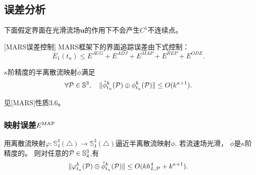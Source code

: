 \subsection{误差分析}
\begin{rem}
  下面假定界面在光滑流场$\mathbf{u}$的作用下不会产生$C^1$不连续点。
\end{rem}

\begin{thm}\cite{zhang2016mars}[MARS误差控制]
  MARS框架下的界面追踪误差由下式控制：
   \begin{equation}
    E_1(t_n)\leq E^{AUG}+E^{ADJ}+E^{MAP}+E^{REP}+E^{ODE}.
  \end{equation}
\end{thm}

\begin{prop}
  $\kappa$阶精度的半离散流映射$\mathring{\phi}$满足
  \begin{equation}
    \label{eq:1}
    \forall {\cal P} \in \mathbb{S}^3,\quad
    \lVert \mathring{\phi}^k_{t_n}({\cal P})\oplus
    \phi^k_{t_n}({\cal P})\rVert \leq O(k^{\kappa +1}).
  \end{equation}
\end{prop}
\begin{pro}
  见[MARS]\cite{zhang2016mars}性质3.6。
\end{pro}

\subsubsection{映射误差$E^{\textmd{MAP}}$}
\label{sec:拟合误差}



\begin{lem}\label{lem:maperror}
  用离散流映射$\varphi:\mathbb{S}^3_4(\triangle)\rightarrow
 \mathbb{S}^3_4(\triangle)$逼近半离散流映射$\mathring{\phi}$.
 若流速场光滑，
 $\mathring{\phi}$是$\kappa$阶精度的。
  则对任意的${\cal P}\in \mathbb{S}^3_4$,有
  \begin{equation}\label{equ:dis-semi}
    \lVert \varphi^k_{t_n}({\cal P})\oplus
    \mathring{\phi}^k_{t_n}({\cal P})\rVert
    \leq O(kh^4_{L,{\cal P}}+k^{\kappa +1}).
  \end{equation}
\end{lem}

